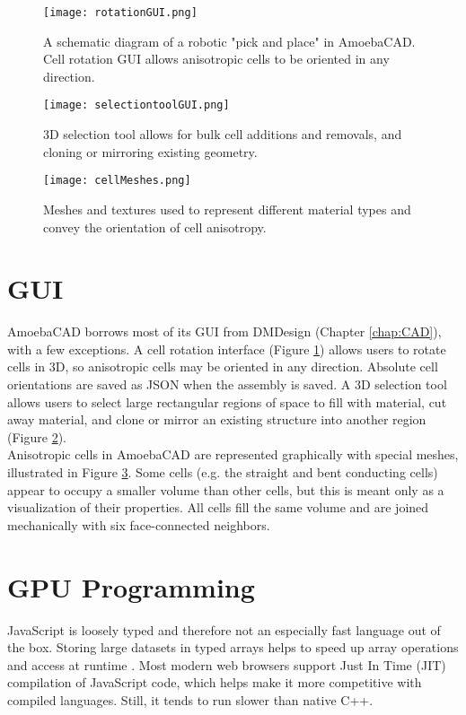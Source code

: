 {\begin{figure}
  \texttt{[image: rotationGUI.png]}
  \caption{A schematic diagram of a robotic "pick and place" in AmoebaCAD.  Cell rotation GUI allows anisotropic cells to be oriented in any direction.}
  \label{fig:rotationGUI}
\end{figure}

\begin{figure}
  \texttt{[image: selectiontoolGUI.png]}
  \caption{3D selection tool allows for bulk cell additions and removals, and cloning or mirroring existing geometry.}
  \label{fig:selectiontoolGUI}
\end{figure}

\begin{figure}
  \texttt{[image: cellMeshes.png]}
  \caption{Meshes and textures used to represent different material types and convey the orientation of cell anisotropy.}
  \label{fig:cellMeshes}
\end{figure}

\section{GUI}

AmoebaCAD borrows most of its GUI from DMDesign (Chapter \ref{chap:CAD}), with a few exceptions.  A cell rotation interface (Figure \ref{fig:rotationGUI}) allows users to rotate cells in 3D, so anisotropic cells may be oriented in any direction.  Absolute cell orientations are saved as JSON when the assembly is saved.  A 3D selection tool allows users to select large rectangular regions of space to fill with material, cut away material, and clone or mirror an existing structure into another region (Figure \ref{fig:selectiontoolGUI}).\\

Anisotropic cells in AmoebaCAD are represented graphically with special meshes, illustrated in Figure \ref{fig:cellMeshes}.  Some cells (e.g. the straight and bent conducting cells) appear to occupy a smaller volume than other cells, but this is meant only as a visualization of their properties.  All cells fill the same volume and are joined mechanically with six face-connected neighbors.

\section{GPU Programming}

JavaScript is loosely typed and therefore not an especially fast language out of the box.  Storing large datasets in typed arrays helps to speed up array operations and access at runtime \cite{Network}.  Most modern web browsers support Just In Time (JIT) compilation of JavaScript code, which helps make it more competitive with compiled languages.    Still, it tends to run slower than native C++.\\

}
